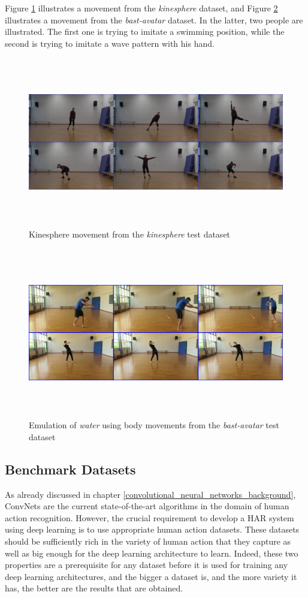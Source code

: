 \documentclass[extern,palatino]{cgMA}
\begin{document}
\noindent Figure \ref{kinesphere_dataset} illustrates a movement from the \textit{kinesphere} dataset, and Figure \ref{bast_avatar} illustrates a movement from the \textit{bast-avatar} dataset. In the latter, two people are illustrated. The first one is trying to imitate a swimming position, while the second is trying to imitate a wave pattern with his hand.

\begin{figure}[h]
\center
\includegraphics[height={210pt}, width={380pt}]{Thesis/images/kinesphere.jpg}
\caption{Kinesphere movement from the \textit{kinesphere} test dataset}
\label{kinesphere_dataset}
\end{figure}

\begin{figure}[h]
\center
\includegraphics[height={210pt}, width={380pt}]{Thesis/images/bast_avatar.jpg}
\caption{Emulation of \textit{water} using body movements from the \textit{bast-avatar} test dataset}
\label{bast_avatar}
\end{figure}
\newpage

\subsection{Benchmark Datasets}
\label{benchmark_datasets}
As already discussed in chapter \ref{convolutional_neural_networks_background}, ConvNets are the current state-of-the-art algorithms in the domain of human action recognition. However, the crucial requirement to develop a HAR system using deep learning is to use appropriate human action datasets. These datasets should be sufficiently rich in the variety of human action that they capture as well as big enough for the deep learning architecture to learn. Indeed, these two properties are a prerequisite for any dataset before it is used for training any deep learning architectures, and the bigger a dataset is, and the more variety it has, the better are the results that are obtained. 
\end{document}
